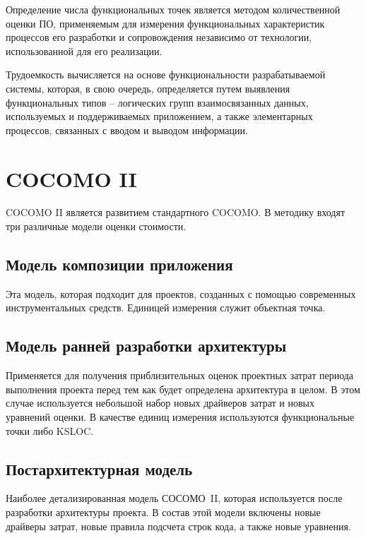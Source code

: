 Определение числа функциональных точек является методом количественной оценки ПО, применяемым для измерения функциональных характеристик процессов его разработки и сопровождения независимо от технологии, использованной для его реализации.

Трудоемкость вычисляется на основе функциональности разрабатываемой системы, которая, в свою очередь, определяется путем выявления функциональных типов -- логических групп взаимосвязанных данных, используемых и поддерживаемых приложением, а также элементарных процессов, связанных с вводом и выводом информации.

\chapter{COCOMO II}

COCOMO II является развитием стандартного COCOMO. В методику входят три различные модели оценки стоимости.

\section{Модель композиции приложения}
Эта модель, которая подходит для проектов, созданных с помощью современных инструментальных средств. Единицей измерения служит объектная точка.

\section{Модель ранней разработки архитектуры}

Применяется для получения приблизительных оценок проектных затрат периода выполнения проекта перед тем как будет определена архитектура в целом. В этом случае используется небольшой набор новых драйверов затрат и новых уравнений оценки. В качестве единиц измерения используются функциональные точки либо KSLOC.

\section{Постархитектурная модель}

Наиболее детализированная модель \mbox{СОСОМО II}, которая используется после разработки архитектуры проекта. В состав этой модели включены новые драйверы затрат, новые правила подсчета строк кода, а также новые уравнения.

